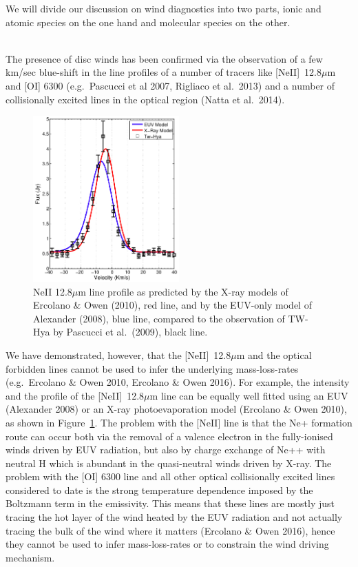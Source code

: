 \documentclass[10pt,fleqn,twoside]{article}
\begin{document}
We will divide our discussion on wind diagnostics into two parts,
ionic and atomic species on the one hand and molecular species on the
other. 

\vspace{0.5em}{\Tcol\bf Ionic and atomic species}\\
The presence of disc winds has been confirmed via the
observation of a few km/sec blue-shift in the line profiles of a
number of tracers like [NeII]~12.8$\mu$m and [OI] 6300 (e.g.\ Pascucci
et al 2007, Rigliaco et al.\ 2013) and a number of collisionally excited lines in the optical
region (Natta et al.\ 2014). 

 \begin{figure}
   \centering
   \includegraphics[width=0.5\textwidth]{neii.jpg}
   \caption{NeII 12.8$\mu$m line profile as predicted by the X-ray
     models of Ercolano \& Owen (2010), red line, and  by the EUV-only
     model of Alexander (2008), blue line, compared to the observation
     of TW-Hya by Pascucci et al.\ (2009), black line.
}
              \label{fig:neii}%
    \end{figure}

We have demonstrated, however, that the  [NeII]~12.8$\mu$m and the
optical forbidden lines 
cannot be used to infer the underlying 
mass-loss-rates (e.g.\ Ercolano \& Owen 2010, Ercolano \& Owen 2016). 
 For example, the intensity and the profile of the [NeII]~12.8$\mu$m line
 can be equally well fitted using an EUV (Alexander 2008) or an X-ray
 photoevaporation model (Ercolano \& Owen 2010), as shown in
 Figure~\ref{fig:neii}. The problem with the 
 [NeII] line is that the Ne+ formation route can occur both via the
 removal of a valence electron in the fully-ionised winds driven by
 EUV radiation, but also by charge exchange of Ne++ with neutral H
 which is abundant in the quasi-neutral winds driven by X-ray. 
The problem with the [OI] 6300 line and all other optical collisionally
excited lines considered to date is the strong temperature dependence
imposed by the Boltzmann term in the emissivity. This means that these
lines are mostly just tracing the hot layer of the wind heated by the
EUV radiation and not actually tracing the bulk of the wind where it
matters (Ercolano \& Owen 2016), hence they
cannot be used to infer mass-loss-rates or to constrain the wind
driving mechanism.   
\end{document}
